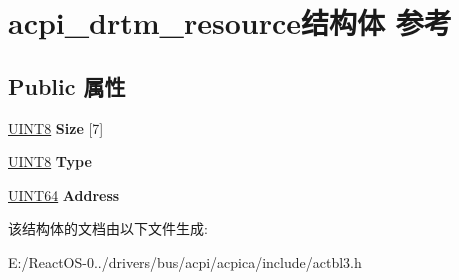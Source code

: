 \hypertarget{structacpi__drtm__resource}{}\section{acpi\+\_\+drtm\+\_\+resource结构体 参考}
\label{structacpi__drtm__resource}
\subsection*{Public 属性}
\begin{DoxyCompactItemize}
\item 
\mbox{\label{structacpi__drtm__resource_a0e491c82237d1474481b403b04f6446b}} 
\hyperlink{_processor_bind_8h_ab27e9918b538ce9d8ca692479b375b6a}{U\+I\+N\+T8} {\bfseries Size} \mbox{[}7\mbox{]}
\item 
\mbox{\label{structacpi__drtm__resource_af17577cadc07871bda684c9869a14941}} 
\hyperlink{_processor_bind_8h_ab27e9918b538ce9d8ca692479b375b6a}{U\+I\+N\+T8} {\bfseries Type}
\item 
\mbox{\label{structacpi__drtm__resource_a043fa039f237ff09512491701c791780}} 
\hyperlink{_processor_bind_8h_a57be03562867144161c1bfee95ca8f7c}{U\+I\+N\+T64} {\bfseries Address}
\end{DoxyCompactItemize}


该结构体的文档由以下文件生成\+:\begin{DoxyCompactItemize}
\item 
E\+:/\+React\+O\+S-\/0../drivers/bus/acpi/acpica/include/actbl3.\+h\end{DoxyCompactItemize}
